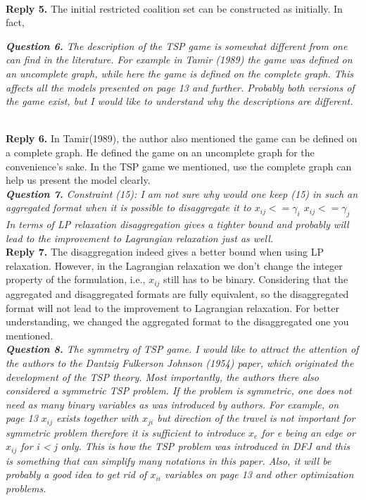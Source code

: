 \documentclass[11pt]{article}
\begin{document}
\\[2mm]
\noindent \textbf{Reply 5.}
The initial restricted coalition set can be constructed as
initially.
In fact,

%
%
%
\noindent \textit{\textbf{Question 6.}
The description of the TSP game is somewhat different from one can find in the literature. For example in Tamir (1989) the game was defined on an uncomplete graph, while here the game is defined on the complete graph. This affects all the models presented on page 13 and further. Probably both versions of the game exist, but I would like to understand why the descriptions are different.}

\\[2mm]
\noindent \textbf{Reply 6.}
In Tamir(1989), the author also mentioned the game can be defined on a complete graph. He defined the game on an uncomplete graph for the convenience's sake. In the TSP game we mentioned, use the complete graph can help us present the model clearly.
\\[4mm]


\noindent \textit{\textbf{Question 7.}
Constraint (15): I am not sure why would one keep (15) in such an aggregated format when it is possible to disaggregate it to
$x_{ij} <= \gamma_i$
$x_{ij} <= \gamma_j$
In terms of LP relaxation disaggregation gives a tighter bound and probably will lead to the improvement to Lagrangian relaxation just as well.}
\\[2mm]
\noindent \textbf{Reply 7.}
The disaggregation indeed gives a better bound when using LP relaxation.
However, in the Lagrangian relaxation we don't change the integer property of the formulation, i.e., $x_{ij}$ still has to be binary.
Considering that the aggregated and disaggregated formats are fully equivalent, so the disaggregated format will not lead to the improvement to Lagrangian relaxation.
For better understanding, we changed the aggregated format to the disaggregated one you mentioned.
\\[4mm]


\noindent \textit{\textbf{Question 8.}
The symmetry of TSP game. I would like to attract the attention of the authors to the Dantzig Fulkerson Johnson (1954) paper, which originated the development of the TSP theory. Most importantly, the authors there also considered a symmetric TSP problem. If the problem is symmetric, one does not need as many binary variables as was introduced by authors. For example, on page 13 $x_{ij}$ exists together with $x_{ji}$ but direction of the travel is not important for symmetric problem therefore it is sufficient to introduce $x_e$ for e being an edge or $x_{ij}$ for i < j only. This is how the TSP problem was introduced in DFJ and this is something that can simplify many notations in this paper. Also, it will be probably a good idea to get rid of $x_{ii}$ variables on page 13 and other optimization problems.}
\end{document}
